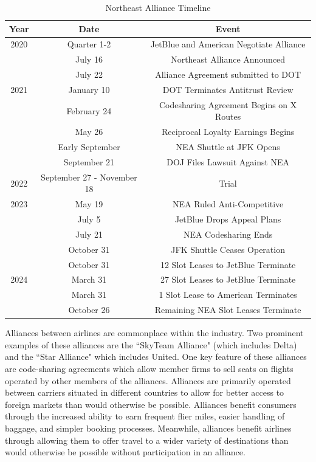 \documentclass{article}
\begin{document}
    \begin{table}[tb]
		\caption{Northeast Alliance Timeline}
		\label{tab:NEA_Timeline}
		\begin{center}
			\begin{tabular}{ccc}
				\hline
				Year & Date & Event \\
				\hline
				2020 & Quarter 1-2 & JetBlue and American Negotiate Alliance \\ 
				& July 16 & Northeast Alliance Announced \\
				& July 22 & Alliance Agreement submitted to DOT \\
				\hline 
				2021 & January 10 & DOT Terminates Antitrust Review \\
				& February 24 & Codesharing Agreement Begins on {X} Routes \\
				& May 26 & Reciprocal Loyalty Earnings Begins \\
				& Early September & NEA Shuttle at JFK Opens \\
				& September 21 & DOJ Files Lawsuit Against NEA \\  
				\hline
				2022 & September 27 - November 18 & Trial \\
				\hline 
				2023 & May 19 & NEA Ruled Anti-Competitive \\
				& July 5 & JetBlue Drops Appeal Plans \\
				& July 21 & NEA Codesharing Ends \\
				& October 31 & JFK Shuttle Ceases Operation\\
				& October 31 & 12 Slot Leases to JetBlue Terminate \\
				\hline 
				2024 &  March 31  & 27 Slot Leases to JetBlue Terminate \\ 
				& March 31 & 1 Slot Lease to American Terminates \\
				& October 26 & Remaining NEA Slot Leases Terminate				 \end{tabular}
		\end{center}
	\end{table}

	Alliances between airlines are commonplace within the industry. Two prominent examples of these alliances are the ``SkyTeam Alliance" (which includes Delta) and the ``Star Alliance" which includes United. One key feature of these alliances are code-sharing agreements which allow member firms to sell seats on flights operated by other members of the alliances. Alliances are primarily operated between carriers situated in different countries to allow for better access to foreign markets than would otherwise be possible. Alliances benefit consumers through the increased ability to earn frequent flier miles, easier handling of baggage, and simpler booking processes. Meanwhile, alliances benefit airlines through allowing them to offer travel to a wider variety of destinations than would otherwise be possible without participation in an alliance. 
	
\end{document}
